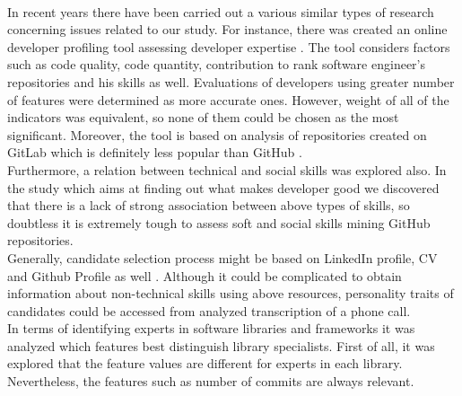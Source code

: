 \\In recent years there have been carried out a various similar types of research concerning issues related to our study. For instance, there was created an online developer profiling tool assessing developer expertise \cite{GitLabProfilingTool}. The tool considers factors such as code quality, code quantity, contribution to rank  software engineer’s repositories and his skills as well. Evaluations of developers using greater number of features were determined as more accurate ones. However, weight of all of the indicators was equivalent, so none of them could be chosen as the most significant. Moreover, the tool is based on analysis of repositories created on GitLab which is definitely less popular than GitHub \cite{GitLabvsGithub}.
\\Furthermore, a relation between technical and social skills \cite{WhatMakesGoodDev} was explored also. In the study which aims at finding out what makes developer good we discovered that there is a lack of strong association between above types of skills, so doubtless it is extremely tough to assess soft and social skills mining GitHub repositories.
\\Generally, candidate selection process might be based on LinkedIn profile, CV and Github Profile as well \cite{CandidateSelection}. Although it could be complicated to obtain information about non-technical skills using above resources, personality traits of candidates could be accessed from analyzed transcription of a phone call.
\\In terms of identifying experts in software libraries and frameworks \cite{SoftwareLibraries} it was analyzed which features best distinguish library specialists. First of all, it was explored that the feature values are different for experts in each library. Nevertheless, the features such as number of commits are always relevant.
